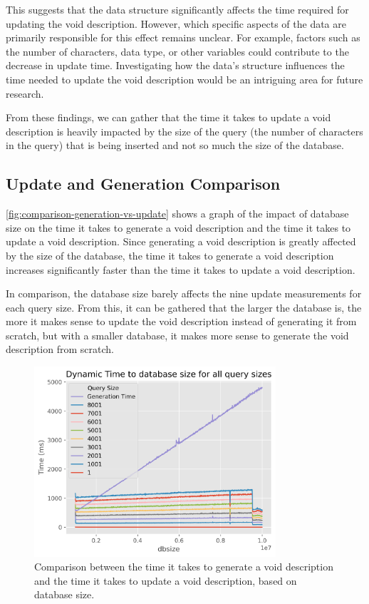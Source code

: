 This suggests that the data structure significantly affects the time required for updating the \gls{void} description. However, which specific aspects of the data are primarily responsible for this effect remains unclear. For example, factors such as the number of characters, data type, or other variables could contribute to the decrease in update time. Investigating how the data's structure influences the time needed to update the \gls{void} description would be an intriguing area for future research.

From these findings, we can gather that the time it takes to update a \gls{void} description is heavily impacted by the size of the query (the number of characters in the query) that is being inserted and not so much the size of the database.


\subsection{Update and Generation Comparison}\label{subsec:update-generation-comparison}
\autoref{fig:comparison-generation-vs-update} shows a graph of the impact of database size on the time it takes to generate a \gls{void} description and the time it takes to update a \gls{void} description. Since generating a \gls{void} description is greatly affected by the size of the database, the time it takes to generate a \gls{void} description increases significantly faster than the time it takes to update a \gls{void} description.

In comparison, the database size barely affects the nine update measurements for each query size. From this, it can be gathered that the larger the database is, the more it makes sense to update the \gls{void} description instead of generating it from scratch, but with a smaller database, it makes more sense to generate the \gls{void} description from scratch.

\begin{figure}[t]
    \centering
    \includegraphics[width=0.8\textwidth]{figures/comparison-Generation-vs-Update.png}
    \caption{Comparison between the time it takes to generate a \gls{void} description and the time it takes to update a \gls{void} description, based on database size.}
    \label{fig:comparison-generation-vs-update}
\end{figure}


